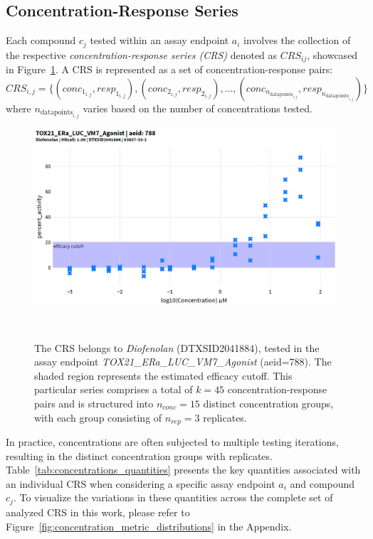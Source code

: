 \subsection{Concentration-Response Series}
Each compound $c_j$ tested within an assay endpoint $a_i$ involves the collection of the respective \emph{concentration-response series (CRS)} denoted as $CRS_{ij}$, showcased in Figure~\ref{fig:concentration_response_series}. A CRS is represented as a set of concentration-response pairs: 
\[ CRS_{i,j} = \{(conc_{1_{i,j}}, resp_{1_{i,j}}), (conc_{2_{i,j}}, resp_{2_{i,j}}), \dots, (conc_{n_{\text{datapoints}_{i,j}}}, resp_{n_{\text{datapoints}_{i,j}}})\} \] where $n_{\text{datapoints}_{i,j}}$ varies based on the number of concentrations tested. 

\begin{figure}
    \centering
    \includegraphics[width=1.0\textwidth]{figures/CRS.png}  
    \caption{The CRS belongs to \emph{Diofenolan} (DTXSID2041884), tested in the assay endpoint \emph{TOX21\_ERa\_LUC\_VM7\_Agonist} (aeid=788). The shaded region represents the estimated efficacy cutoff. This particular series comprises a total of $k = 45$ concentration-response pairs and is structured into $n_{conc} = 15$ distinct concentration groups, with each group consisting of $n_{rep} = 3$ replicates. }
~\label{fig:concentration_response_series} 
\end{figure}

In practice, concentrations are often subjected to multiple testing iterations, resulting in the distinct concentration groups with replicates. Table~\ref{tab:concentrations_quantities} presents the key quantities associated with an individual CRS when considering a specific assay endpoint $a_i$ and compound $c_j$. To visualize the variations in these quantities across the complete set of analyzed CRS in this work, please refer to Figure~\ref{fig:concentration_metric_distributions} in the Appendix. 

